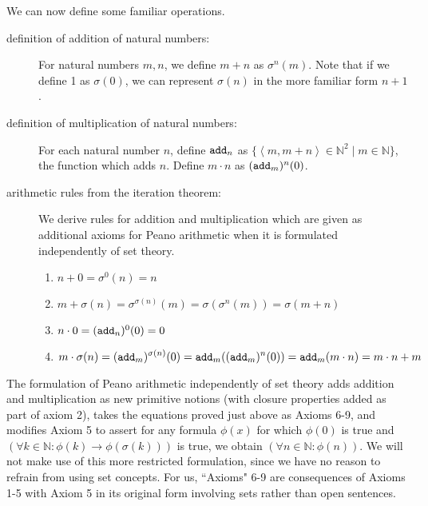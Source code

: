 \documentclass[12pt]{book}
\begin{document}
We can now define some familiar operations.

\begin{description}

\item[definition of addition of natural numbers:]  For natural numbers $m,n$, we define $m+n$ as $\sigma^n(m)$.  Note that if we define 1 as $\sigma(0)$, we can represent $\sigma(n)$ in the more familiar form $n+1$.

\item[definition of multiplication of natural numbers:]  For each natural number $n$, define ${\tt add}_n$ as $\{\left<m,m+n\right>\in {\mathbb N}^2 \mid m \in {\mathbb N}\}$, the function which adds $n$.  Define $m \cdot n$ as $({\tt add}_m)^n(0)$.

\item[arithmetic rules from the iteration theorem:]

We derive rules for addition and multiplication which are given as additional axioms for Peano arithmetic when it is formulated independently of set theory.

\begin{enumerate}

\item $n+0 = \sigma^0(n) = n$

\item $m+\sigma(n) = \sigma^{\sigma(n)}(m) = \sigma(\sigma^n(m)) = \sigma(m+n)$

\item $n \cdot 0 = ({\tt add}_n)^0(0) = 0$

\item $$m \cdot \sigma(n) = ({\tt add}_m)^{\sigma(n)}(0) = {\tt add}_m(({\tt add}_m)^n(0)) = {\tt add}_m(m \cdot n) = m\cdot n + m$$

\end{enumerate}

\end{description}

The formulation of Peano arithmetic independently of set theory adds addition and multiplication as new primitive notions (with closure properties added as part of axiom 2), takes the equations proved just above as Axioms 6-9, and modifies Axiom 5 to assert for any
formula $\phi(x)$ for which $\phi(0)$ is true and $(\forall k \in \mathbb N:\phi(k) \rightarrow \phi(\sigma(k)))$ is true, we obtain $(\forall n \in \mathbb N:\phi(n))$.  We will not make use of this more restricted formulation, since we have no reason to refrain from using set concepts.  For us, ``Axioms" 6-9 are consequences of Axioms 1-5 with Axiom 5 in its original form involving sets rather than open sentences.
\end{document}
